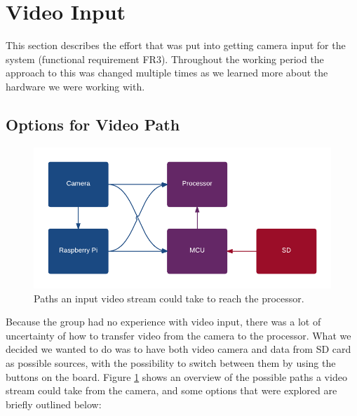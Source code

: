 \section{Video Input}
This section describes the effort that was put into getting camera input for the system (functional requirement FR3).
Throughout the working period the approach to this was changed multiple times as we learned more about the hardware we were working with.




\subsection{Options for Video Path}
\begin{figure}
    \centering
    \includegraphics[width=\linewidth]{img/VideoPath}
    \caption{Paths an input video stream could take to reach the processor.}
    \label{fig:VideoPath}
\end{figure}

Because the group had no experience with video input,
there was a lot of uncertainty of how to transfer video from the camera to the processor.
What we decided we wanted to do was to have both video camera and data from SD card as possible sources,
with the possibility to switch between them by using the buttons on the board.
Figure \ref{fig:VideoPath} shows an overview of the possible paths a video stream could take from the camera,
and some options that were explored are briefly outlined below:

